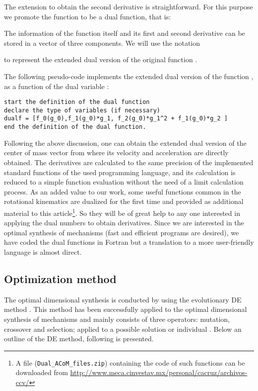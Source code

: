 \documentclass[11pt]{article}
\begin{document}
The extension to obtain the second derivative is straightforward. For 
this purpose we promote the  function to be a 
dual function, that is:


The information of the function itself and its first and second 
derivative can be stored in a vector of three components.  We will use 
the notation 

to represent the extended dual version of the original function .

The following pseudo-code implements the extended dual 
version  of the function , as a function of 
the dual variable :

\begin{verbatim}
start the definition of the dual function 
declare the type of variables (if necessary)
dualf = [f_0(g_0),f_1(g_0)*g_1, f_2(g_0)*g_1^2 + f_1(g_0)*g_2 ]
end the definition of the dual function. 
\end{verbatim}
 
Following the above discussion, one can obtain the extended dual version 
of the center of mass vector from where its velocity and acceleration 
are  directly obtained. The derivatives are calculated to the same 
precision of the implemented standard functions of the used programming 
language, and its calculation is reduced to a simple function evaluation 
without the need of a limit calculation process. As an added value to 
our work, some useful functions common in the rotational kinematics are 
dualized for the first time and provided as additional material to this 
article\footnote{A file ({\tt Dual\_ACoM\_files.zip}) containing the 
code of such functions can be downloaded from 
\url{http://www.meca.cinvestav.mx/personal/cacruz/archivos-ccv/} }. 
So they will be of great help to any one interested in applying the dual 
numbers to obtain derivatives. Since we are interested in the optimal 
synthesis of mechanisms (fast and efficient programs are desired), we 
have coded the dual functions in Fortran but a translation to a more 
user-friendly language is almost direct. 

\subsection{Optimization method}
The optimal dimensional synthesis is conducted by using the evolutionary 
DE method \cite{Price_Storn2005}. This method has been successfully 
applied to the optimal dimensional synthesis of mechanisms 
\cite{Cabrera2007,Bulatovic2009,NewVillage2011,Cabrera2011} 
and mainly consists of three operators:  mutation, crossover and 
selection; applied to a possible solution or individual .  
Below an outline of the DE method, following  \cite{Price_Storn2005} is 
presented.
\end{document}
